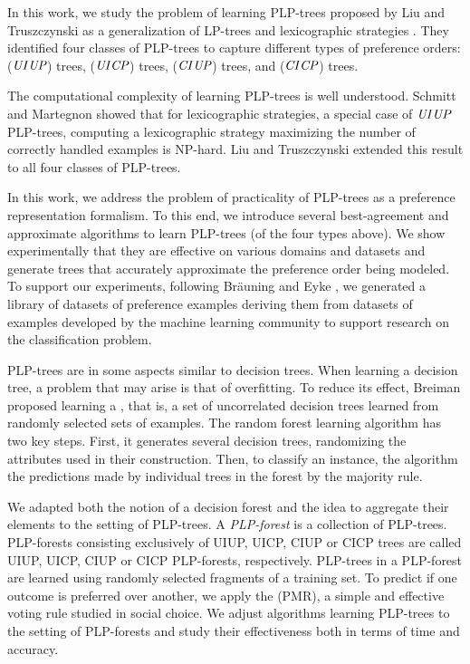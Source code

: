 In this work, we study the problem of learning PLP-trees proposed by 
Liu and Truszczynski \cite{conf/aaai15/LiuT} as a generalization 
of LP-trees \cite{booth:learningLP} and lexicographic strategies 
\cite{schmitt2006complexity}. They identified four classes of PLP-trees to 
capture different types of preference orders:  ($\textit{UI}$$\textit{UP}$) trees,  ($\textit{UI}$$\textit{CP}$) trees,  ($\textit{CI}$$\textit{UP}$) trees, and 
 ($\textit{CI}$$\textit{CP}$) trees. 

The computational complexity of learning PLP-trees is well understood. 
Schmitt and Martegnon \cite{schmitt2006complexity} showed that for 
lexicographic strategies, a special case of $\textit{UI}$$\textit{UP}$ PLP-trees, computing 
a lexicographic strategy maximizing the number of correctly handled 
examples is NP-hard. Liu and Truszczynski \cite{conf/aaai15/LiuT} extended 
this result to all four classes of PLP-trees.

In this work, we address the problem of practicality of PLP-trees as 
a preference representation formalism. To this end, we introduce several 
best-agreement and approximate algorithms to learn PLP-trees (of the four types
above). We show experimentally that they are effective on various domains
and datasets and generate trees that accurately approximate the preference 
order being modeled. To support our experiments, following Br{\"a}uning 
and Eyke \cite{brauning2012learning}, we generated a library of datasets 
of preference examples deriving them from datasets of examples developed 
by the machine learning community to support research on the classification 
problem.

PLP-trees are in some aspects similar to decision trees. 
When learning a decision tree, a problem that may arise is that of 
overfitting. To reduce its effect, Breiman \cite{breiman2001random} 
proposed learning a , that is, a set of uncorrelated 
decision trees learned from randomly selected sets of examples. The 
random forest learning algorithm \cite{breiman2001random} has two key 
steps. First, it generates several decision trees, randomizing the attributes
used in their construction. Then, to classify an instance, the algorithm 
 the predictions made by individual trees in the forest 
by the majority rule. 

We adapted both the notion of a decision forest and 
the idea to aggregate their elements to the 
setting of PLP-trees. A \emph{PLP-forest} is a collection of PLP-trees. 
PLP-forests consisting exclusively of UIUP, UICP, CIUP or CICP trees are
called UIUP, UICP, CIUP or CICP PLP-forests, respectively.
PLP-trees in a PLP-forest are learned using randomly selected  
fragments of a training set. To predict if one outcome is preferred over 
another, we apply the  (PMR), a simple and 
effective voting rule studied in social choice. We adjust algorithms 
learning PLP-trees to the setting of PLP-forests and study their 
effectiveness both in terms of time and accuracy.

